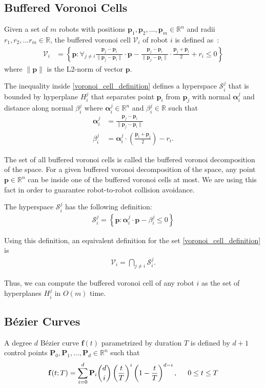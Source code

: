 \documentclass{svproc}
\newcommand{\vp}{\mathbf{p}}
\newcommand{\valpha}{\mathbf{\alpha}}
\newcommand{\vP}{\mathbf{P}}
\newcommand{\vf}{\mathbf{f}}
\newcommand{\cV}{\mathcal{V}}
\newcommand{\cS}{\mathcal{S}}
\newcommand{\R}{\mathbb{R}} %
\begin{document}
\subsection{Buffered Voronoi Cells} \label{bufferedVoronoi}
Given a set of $m$ robots with positions $\vp_1,\vp_2,\ldots,\vp_m \in \R^n$ and radii $r_1,r_2,...r_m \in \R$, the buffered voronoi cell $\cV_i$ of robot $i$ is defined as~\cite{bufferedVoronoiCells}:
\begin{align}
    \cV_i &= \left\{\vp : \forall_{j\neq i} \frac{\vp_j-\vp_i}{\|\vp_j-\vp_i\|}\cdot \vp - \frac{\vp_j-\vp_i}{\|\vp_j-\vp_i\|}\cdot \frac{\vp_j+\vp_i}{2} + r_i\leq 0 \right\} \label{voronoi_cell_definition}
\end{align}
where $\|\vp\|$ is the L2-norm of vector $\vp$.

The inequality inside \eqref{voronoi_cell_definition} defines a hyperspace $\cS_i^j$ that is bounded by hyperplane $H_i^j$ that separates point $\vp_i$ from $\vp_j$ with normal $\valpha_i^j$ and distance along normal $\beta_i^j$ where $\valpha_i^j\in \R^n$ and $\beta_i^j\in \R$ such that
\begin{align}
    \valpha_i^j &= \frac{\vp_j - \vp_i}{\|\vp_j-\vp_i\|}\label{voronoiAlpha}\\
    \beta_i^j &= \valpha_i^j \cdot \left(\frac{\vp_i + \vp_j}{2}\right) - r_i. \label{voronoiBeta}
\end{align}

The set of all buffered voronoi cells is called the buffered voronoi decomposition of the space. For a given buffered voronoi decomposition of the space, any point $\vp\in \R^n$ can be inside one of the buffered voronoi cells at most. We are using this fact in order to guarantee robot-to-robot collision avoidance.

The hyperspace $\cS_i^j$ has the following definition:
\begin{align}
    \cS_i^j = \left\{\vp : \valpha_i^j \cdot \vp - \beta_i^j \leq 0\right\}
\end{align}

Using this definition, an equivalent definition for the set \eqref{voronoi_cell_definition} is
\begin{align}
    \cV_i = \bigcap\limits_{j\neq i} \cS_i^j \label{voronoiEquation}.
\end{align}

Thus, we can compute the buffered voronoi cell of any robot $i$ as the set of hyperplanes $H_i^j$ in $O(m)$ time.

\subsection{B\'ezier Curves} \label{bezierCurves}
A degree $d$ B\'ezier curve $\vf(t)$ parametrized by duration $T$ is defined by $d+1$ control points $\vP_0, \vP_1, ..., \vP_d \in \R^n$ such that
\begin{align}
    \vf(t; T) = \sum_{i=0}^d \vP_i {d\choose i}\left(\frac{t}{T}\right)^i\left(1-\frac{t}{T}\right)^{d-i},\hskip .5cm 0\leq t \leq T
\end{align}
\end{document}
